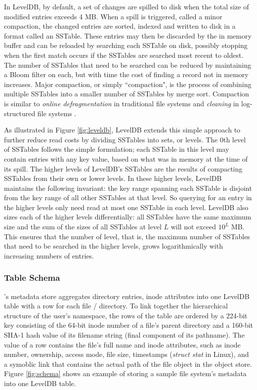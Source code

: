 In LevelDB, by default, a set of changes are spilled to disk when the total size of modified entries exceeds 4 MB.  When a spill is triggered, called a minor compaction, the changed entries are sorted, indexed and written to disk in a format called an SSTable\citep{BigTable}.  These entries may then be discarded by the in memory buffer and can be reloaded by searching each SSTable on disk, possibly stopping when the first match occurs if the SSTables are searched most recent to oldest.  The number of SSTables that need to be searched can be reduced by maintaining a Bloom filter\citep{bloomfilter} on each, but with time the cost of finding a record not in memory increases.  Major compaction, or simply ``compaction", is the process of combining multiple SSTables into a smaller number of SSTables by merge sort. Compaction is similar to \emph{online defragmentation} in traditional file systems and \emph{cleaning} in log-structured file systems \citep{LFS}.

As illustrated in Figure \ref{fig:leveldb}, LevelDB extends this simple approach to further reduce read costs by dividing SSTables into sets, or levels.
The 0th level of SSTables follows the simple formulation; each SSTable in this level may contain entries with any key value, based on what was in memory at the time of its spill.
The higher levels of LevelDB's SSTables are the results of compacting SSTables from their own or lower levels.
In these higher levels, LevelDB maintains the following invariant: the key range spanning each SSTable is disjoint from the key range of all other SSTables at that level.
So querying for an entry in the higher levels only need read at most one SSTable in each level.
LevelDB also sizes each of the higher levels differentially:  all SSTables have the same maximum size and the sum of the sizes of all SSTables at level $L$ will not exceed $10^L$ MB.
This ensures that the number of level, that is, the maximum number of SSTables that need to be searched in the higher levels, grows logarithmically with increasing numbers of entries.

\subsubsection*{Table Schema} 

\tfs's metadata store aggregates directory entries, 
inode attributes into one LevelDB table with a row for each file / directory.
To link together the hierarchical structure of the user's namespace,
the rows of the table are ordered by a 224-bit key consisting of 
the 64-bit inode number of a file's parent directory 
and a 160-bit SHA-1 hash value of its filename string (final component of its pathname).
The value of a row contains the file's full name and inode attributes,
such as inode number, ownership, access mode, file size, timestamps (\textit{struct stat} in Linux),
and a symoblic link that contains the actual path of the file object in the object store.
Figure \ref{fig:schema} shows an example of storing a sample file system's metadata into one LevelDB table.

